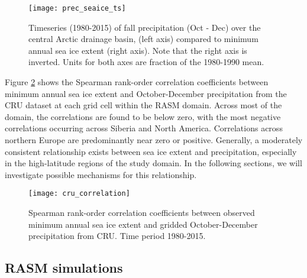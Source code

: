 \begin{figure}
  \centering
  \texttt{[image: prec\_seaice\_ts]}
  \caption{Timeseries (1980-2015) of fall precipitation (Oct - Dec) over the central Arctic drainage basin, (left axis) compared to minimum annual sea ice extent (right axis). Note that the right axis is inverted. Units for both axes are fraction of the 1980-1990 mean.}
  \label{fig:prec_ice_ts}
\end{figure}

Figure \ref{fig:prec_spatial_corr} shows the Spearman rank-order correlation coefficients between minimum annual sea ice extent and October-December precipitation from the CRU dataset at each grid cell within the RASM domain.
Across most of the domain, the correlations are found to be below zero, with the most negative correlations occurring across Siberia and North America.
Correlations across northern Europe are predominantly near zero or positive. %
Generally, a moderately consistent relationship exists between sea ice extent and precipitation, especially in the high-latitude regions of the study domain.
In the following sections, we will investigate possible mechanisms for this relationship.

\begin{figure}
  \centering
  \texttt{[image: cru\_correlation]}
  \caption{Spearman rank-order correlation coefficients between observed minimum annual sea ice extent and gridded October-December precipitation from CRU. Time period 1980-2015.}
  \label{fig:prec_spatial_corr}
\end{figure}

\subsection{RASM simulations}
\label{sec:rasm_results}



